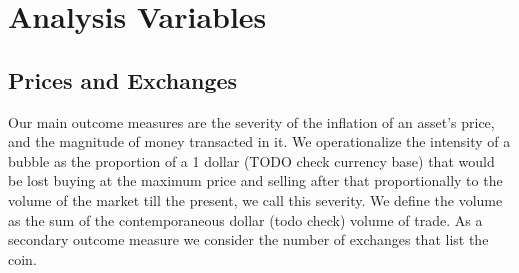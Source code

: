 \section{Analysis Variables}
\subsection{Prices and Exchanges}
Our main outcome measures are the severity of the inflation of an asset's price, and the magnitude of money transacted in it.
We operationalize the intensity of a bubble as the proportion of a 1 dollar (TODO check currency base) that would be lost buying at the maximum price and selling after that proportionally to the volume of the market till the present, we call this severity.
We define the volume as the sum of the contemporaneous dollar (todo check) volume of trade.
As a secondary outcome measure we consider the number of exchanges that list the coin.
